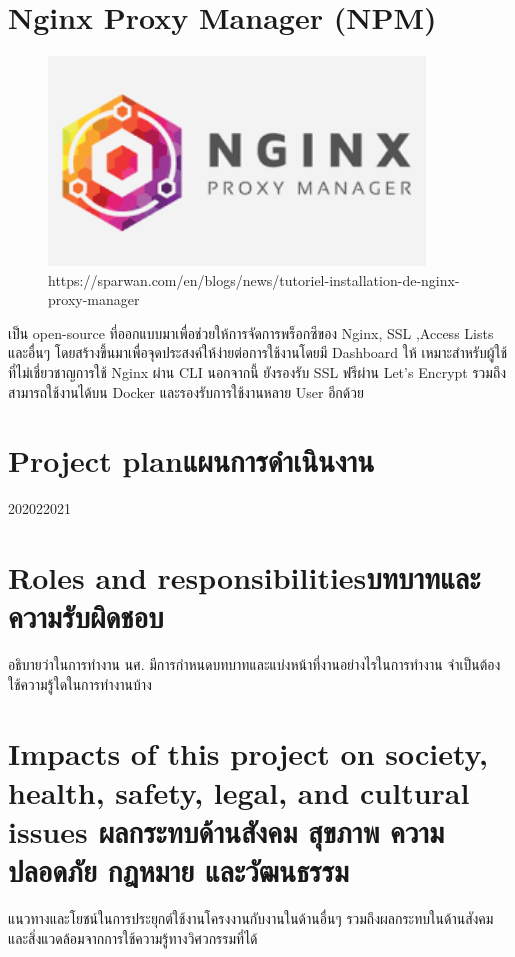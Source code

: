 \section{Nginx Proxy Manager (NPM)}
\begin{figure}[H]
  \centering
  \includegraphics[width=100mm, keepaspectratio ]{pictures/npm.png}
  \caption[Poem]{https://sparwan.com/en/blogs/news/tutoriel-installation-de-nginx-proxy-manager}
\end{figure}
\hspace{1.27cm}เป็น open-source ที่ออกแบบมาเพื่อช่วยให้การจัดการพร็อกซีของ Nginx, SSL ,Access Lists และอื่นๆ โดยสร้างขึ้นมาเพื่อจุดประสงค์ให้ง่ายต่อการใช้งานโดยมี Dashboard ให้ เหมาะสำหรับผู้ใช้ที่ไม่เชี่ยวชาญการใช้ Nginx ผ่าน CLI นอกจากนี้ ยังรองรับ SSL ฟรีผ่าน Let's Encrypt รวมถึงสามารถใช้งานได้บน Docker และรองรับการใช้งานหลาย User อีกด้วย

\section{\ifenglish Project plan\else แผนการดำเนินงาน\fi}

\begin{plan}{6}{2020}{2}{2021}
\end{plan}

\section{\ifenglish Roles and responsibilities\else บทบาทและความรับผิดชอบ\fi}
อธิบายว่าในการทำงาน นศ. มีการกำหนดบทบาทและแบ่งหน้าที่งานอย่างไรในการทำงาน จำเป็นต้องใช้ความรู้ใดในการทำงานบ้าง

\section{\ifenglish%
Impacts of this project on society, health, safety, legal, and cultural issues
\else%
ผลกระทบด้านสังคม สุขภาพ ความปลอดภัย กฎหมาย และวัฒนธรรม
\fi}

แนวทางและโยชน์ในการประยุกต์ใช้งานโครงงานกับงานในด้านอื่นๆ รวมถึงผลกระทบในด้านสังคมและสิ่งแวดล้อมจากการใช้ความรู้ทางวิศวกรรมที่ได้
